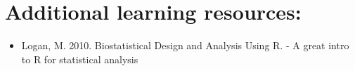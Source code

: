 \documentclass[]{book}
\providecommand{\tightlist}{%
  \setlength{\itemsep}{0pt}\setlength{\parskip}{0pt}}
\begin{document}
\hypertarget{additional-learning-resources-9}{%
\section{Additional learning resources:}\label{additional-learning-resources-9}}

\begin{itemize}
\tightlist
\item
  Logan, M. 2010. Biostatistical Design and Analysis Using R. - A great intro to R for statistical analysis
\end{itemize}


\end{document}
